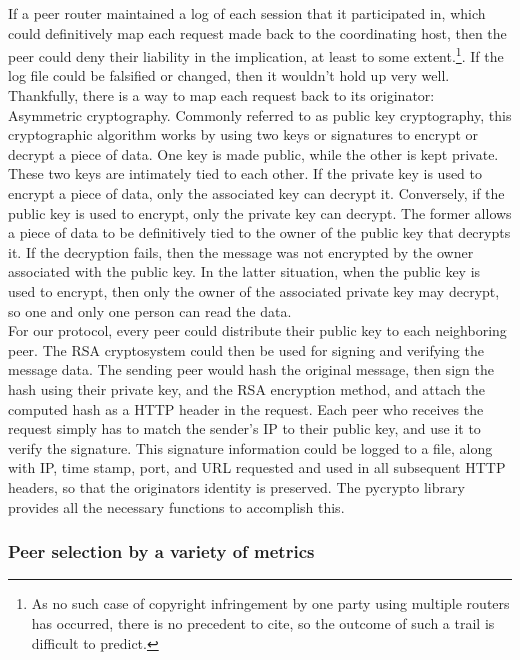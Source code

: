 \documentclass[12pt]{article}
\begin{document}
			If a peer router maintained a log of each session that it participated in, which could definitively map each request made back to the coordinating host, then the peer could deny their liability in the implication, at least to some extent.\footnote{As no such case of copyright infringement by one party using multiple routers has occurred, there is no precedent to cite, so the outcome of such a trail is difficult to predict.}. If the log file could be falsified or changed, then it wouldn't hold up very well. Thankfully, there is a way to map each request back to its originator: Asymmetric cryptography. Commonly referred to as public key cryptography, this cryptographic algorithm works by using two keys or signatures to encrypt or decrypt a piece of data. One key is made public, while the other is kept private. These two keys are intimately tied to each other. If the private key is used to encrypt a piece of data, only the associated key can decrypt it. Conversely, if the public key is used to encrypt, only the private key can decrypt. The former allows a piece of data to be definitively tied to the owner of the public key that decrypts it. If the decryption fails, then the message was not encrypted by the owner associated with the public key. In the latter situation, when the public key is used to encrypt, then only the owner of the associated private key may decrypt, so one and only one person can read the data.\\

			For our protocol, every peer could distribute their public key to each neighboring peer. The RSA cryptosystem could then be used for signing and verifying the message data. The sending peer would hash the original message, then sign the hash using their private key, and the RSA encryption method, and attach the computed hash as a HTTP header in the request. Each peer who receives the request simply has to match the sender's IP to their public key, and use it to verify the signature. This signature information could be logged to a file, along with IP, time stamp, port, and URL requested and used in all subsequent HTTP headers, so that the originators identity is preserved. The pycrypto library provides all the necessary functions to accomplish this.\\

		\subsubsection{Peer selection by a variety of metrics}
\end{document}
